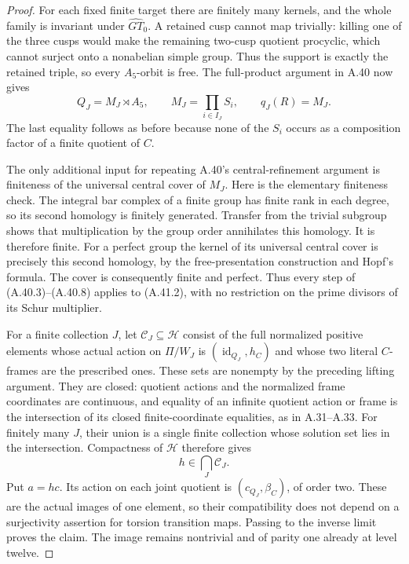 \begin{proof}
For each fixed finite target there are finitely
many kernels, and the whole family is invariant
under \(\widehat{GT}_0\). A retained cusp cannot
map trivially: killing one of the three cusps
would make the remaining two-cusp quotient
procyclic, which cannot surject onto a nonabelian
simple group. Thus the support is exactly the
retained triple, so every \(A_5\)-orbit is free.
The full-product argument in A.40 now gives
\[
 Q_J=M_J\rtimes A_5,
 \qquad M_J=\prod_{i\in I_J}S_i,
 \qquad q_J(R)=M_J.
 \tag{A.41.2}
\]
The last equality follows as before because none
of the \(S_i\) occurs as a composition factor
of a finite quotient of \(C\).

The only additional input for repeating A.40's
central-refinement argument is finiteness of the
universal central cover of \(M_J\). Here is the
elementary finiteness check. The integral bar
complex of a finite group has finite rank in
each degree, so its second homology is finitely
generated. Transfer from the trivial subgroup
shows that multiplication by the group order
annihilates this homology.\cite[Section~2 and
Corollary~3.4]{ABrown2010} It is therefore finite.
For a perfect group the kernel of its universal
central cover is precisely this second homology,
by the free-presentation construction and Hopf's
formula. The cover is consequently finite and
perfect. Thus every step of (A.40.3)--(A.40.8)
applies to (A.41.2), with no restriction on the
prime divisors of its Schur multiplier.

For a finite collection \(J\), let
\(\mathscr C_J\subseteq\mathcal H\) consist of
the full normalized positive elements whose
actual action on \(\Pi/W_J\) is
\((\operatorname{id}_{Q_J},h_C)\) and whose
two literal \(C\)-frames are the prescribed
ones. These sets are nonempty by the preceding
lifting argument. They are closed: quotient
actions and the normalized frame coordinates
are continuous, and equality of an infinite
quotient action or frame is the intersection
of its closed finite-coordinate equalities,
as in A.31--A.33. For finitely many \(J\),
their union is a single finite collection whose
solution set lies in the intersection. Compactness
of \(\mathcal H\) therefore gives
\[
                         h\in\bigcap_J\mathscr C_J.
\]
Put \(a=hc\). Its action on each joint quotient
is \((c_{Q_J},\beta_C)\), of order two.
These are the actual images of one element,
so their compatibility does not depend on a
surjectivity assertion for torsion transition
maps. Passing to the inverse limit proves the
claim. The image remains nontrivial and of
parity one already at level twelve.
\end{proof}

